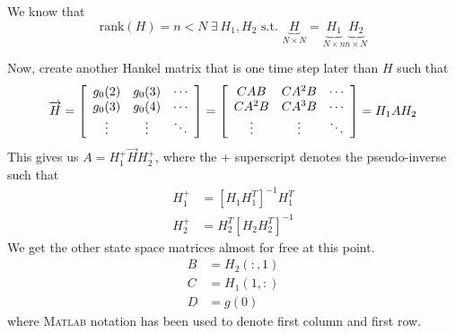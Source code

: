 We know that
$$\text{rank}(H)=n<N ~\exists~ H_1, H_2 \text{ s.t. } \underbrace{H}_{N\times N} = \underbrace{H_1}_{N\times n} \underbrace{H_2}_{n\times N}$$

Now, create another Hankel matrix that is one time step later than $H$ such that
\begin{align*}
\overrightarrow{H} = \left[\begin{array}{c c c} g_0(2) & g_0(3) & \cdots \\ g_0(3) & g_0(4) & \cdots \\ \vdots & \vdots & \ddots \end{array}\right]
= \left[\begin{array}{c c c} CAB & CA^2B & \cdots \\ CA^2B & CA^3B & \cdots \\ \vdots & \vdots & \ddots \end{array}\right] = H_1AH_2
\end{align*}
This gives us $A=H_1^+\overrightarrow{H}H_2^+$, where the $+$ superscript denotes the pseudo-inverse such that
\begin{align*}
H_1^+ &= [H_1H_1^T]^{-1}H_1^T \\
H_2^+ &= H_2^T[H_2H_2^T]^{-1}
\end{align*}
We get the other state space matrices almost for free at this point.
\begin{align*}
B &= H_2(:,1) \\
C &= H_1(1,:) \\
D &= g(0)
\end{align*}
where \textsc{Matlab} notation has been used to denote first column and first row.

